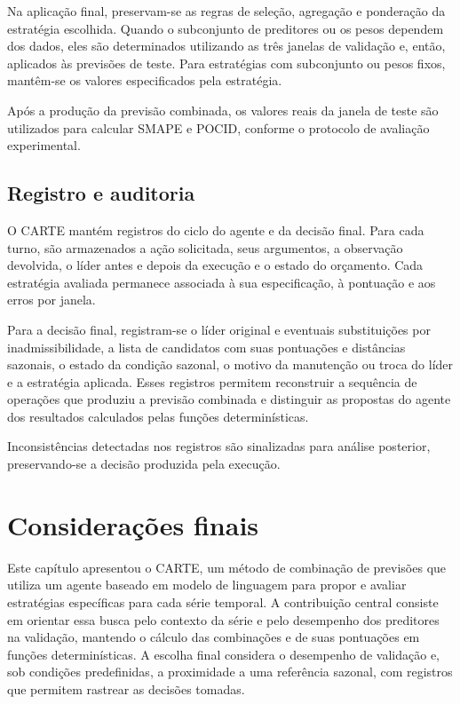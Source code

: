 Na aplicação final, preservam-se as regras de seleção, agregação e ponderação da estratégia escolhida. Quando o subconjunto de preditores ou os pesos dependem dos dados, eles são determinados utilizando as três janelas de validação e, então, aplicados às previsões de teste. Para estratégias com subconjunto ou pesos fixos, mantêm-se os valores especificados pela estratégia.

Após a produção da previsão combinada, os valores reais da janela de teste são utilizados para calcular SMAPE e POCID, conforme o protocolo de avaliação experimental.

\subsection{Registro e auditoria}
\label{subsec:auditoria}

O CARTE mantém registros do ciclo do agente e da decisão final. Para cada turno, são armazenados a ação solicitada, seus argumentos, a observação devolvida, o líder antes e depois da execução e o estado do orçamento. Cada estratégia avaliada permanece associada à sua especificação, à pontuação e aos erros por janela.

Para a decisão final, registram-se o líder original e eventuais substituições por inadmissibilidade, a lista de candidatos com suas pontuações e distâncias sazonais, o estado da condição sazonal, o motivo da manutenção ou troca do líder e a estratégia aplicada. Esses registros permitem reconstruir a sequência de operações que produziu a previsão combinada e distinguir as propostas do agente dos resultados calculados pelas funções determinísticas.

Inconsistências detectadas nos registros são sinalizadas para análise posterior, preservando-se a decisão produzida pela execução.

\section{Considerações finais}
\label{sec:consideracoes-finais-proposta}

Este capítulo apresentou o CARTE, um método de combinação de previsões que utiliza um agente baseado em modelo de linguagem para propor e avaliar estratégias específicas para cada série temporal. A contribuição central consiste em orientar essa busca pelo contexto da série e pelo desempenho dos preditores na validação, mantendo o cálculo das combinações e de suas pontuações em funções determinísticas. A escolha final considera o desempenho de validação e, sob condições predefinidas, a proximidade a uma referência sazonal, com registros que permitem rastrear as decisões tomadas.


